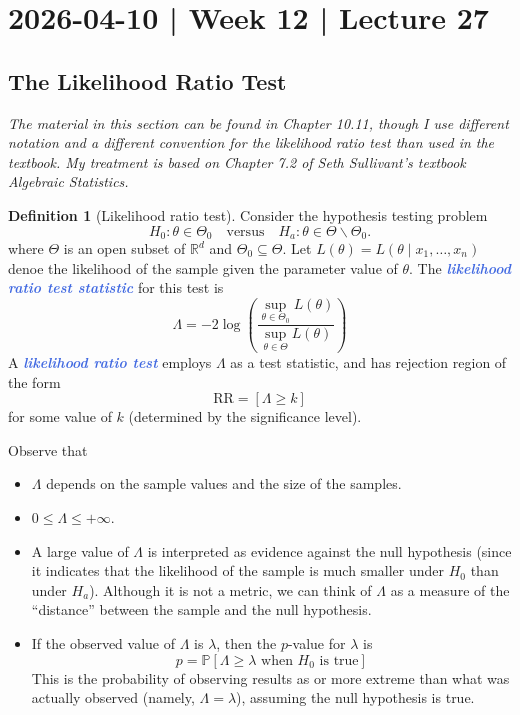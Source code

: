\documentclass[10pt]{article}
\theoremstyle{definition}
\newtheorem{definition}[theorem]{Definition}
\newcommand{\1}[1]{\textbf{1}_{\left[#1\right]}} %
\def\R{\mathbb{R}} %
\def\P{\mathbb{P}} %
\newcommand{\demph}[1]{\textcolor{RoyalBlue}{\textbf{\slshape #1}}} %
\begin{document}
\newpage
\section{2026-04-10 | Week 12 | Lecture 27}
\subsection{The Likelihood Ratio Test}
\textit{The material in this section can be found in Chapter 10.11, though I use
different notation and a different convention for the likelihood ratio test
than used in the textbook. My treatment is based on Chapter 7.2 of Seth
Sullivant's textbook \textit{Algebraic Statistics}.}

\begin{definition}[Likelihood ratio test]
  Consider the hypothesis testing problem
  \begin{equation*}
    H_{0}:\theta\in \Theta_{0} \quad \text{versus} \quad H_{a}:\theta\in \Theta\backslash \Theta_{0}.
  \end{equation*}
  where $\Theta$ is an open subset of $\R^{d}$ and
  $\Theta_{0}\subseteq \Theta$. Let
  $L(\theta) = L(\theta\mid x_{1},\ldots,x_{n})$ denoe the likelihood of the
  sample given the parameter value of $\theta$. The \demph{likelihood ratio
    test statistic} for this test is
  \begin{equation}\label{eq:definition-of-LR-test-statistic}
    \Lambda = -2 \log\left( \frac{\sup_{\theta\in \Theta_{0}}L(\theta)}{\sup_{\theta\in \Theta}L(\theta)} \right)
  \end{equation}
  A \demph{likelihood ratio test} employs $\Lambda$ as a test statistic, and has
  rejection region of the form
  \begin{equation*}
    \text{RR} = \left[ \Lambda \geq k\right] 
  \end{equation*}
  for some value of $k$ (determined by the significance level).
\end{definition}

Observe that
\begin{itemize}
  \item $\Lambda$ depends on the sample values and the size of the samples.
  \item $0 \leq \Lambda \leq +\infty$.
  \item A large value of $\Lambda$ is interpreted as evidence against the null
  hypothesis (since it indicates that the likelihood of the sample is much
  smaller under $H_{0}$ than under $H_{a}$). Although it is not a metric, we
  can think of $\Lambda$ as a measure of the ``distance'' between the sample
  and the null hypothesis.
  \item If the observed value of $\Lambda$ is $\lambda$, then the $p$-value
  for $\lambda$ is
  \begin{equation*}
    p
    = \P\left[\Lambda \geq \lambda \text{ when }H_{0} \text{ is true}\right]
  \end{equation*}
  This is the probability of observing results as or more extreme than what
  was actually observed (namely, $\Lambda=\lambda$), assuming the null
  hypothesis is true.
\end{itemize}
\end{document}

